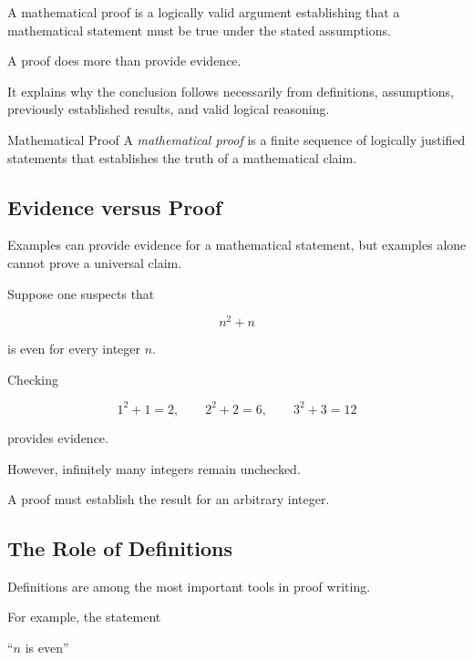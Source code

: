 A mathematical proof is a logically valid argument establishing that a
mathematical statement must be true under the stated assumptions.

A proof does more than provide evidence.

It explains why the conclusion follows necessarily from definitions,
assumptions, previously established results, and valid logical reasoning.

\begin{definitionbox}{Mathematical Proof}
A \emph{mathematical proof} is a finite sequence of logically justified
statements that establishes the truth of a mathematical claim.
\end{definitionbox}

\subsection{Evidence versus Proof}
\label{subsec:evidence-versus-proof}

Examples can provide evidence for a mathematical statement, but examples alone
cannot prove a universal claim.

Suppose one suspects that

\[ n^2+n \]

is even for every integer \(n\).

Checking

\[ 1^2+1=2,\qquad 2^2+2=6,\qquad 3^2+3=12 \]

provides evidence.

However, infinitely many integers remain unchecked.

A proof must establish the result for an arbitrary integer.

\subsection{The Role of Definitions}
\label{subsec:definitions-in-proof}

Definitions are among the most important tools in proof writing.

For example, the statement

\begin{center}
``\(n\) is even''
\end{center}

